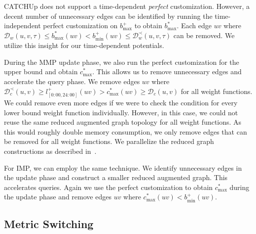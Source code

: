 \documentclass[a4paper,UKenglish,cleveref, autoref, thm-restate]{lipics-v2021}
\newcommand*{\comb}{c}
\newcommand*{\dist}{\mathcal{D}}
\begin{document}
CATCHUp does not support a time-dependent \emph{perfect} customization.
However, a decent number of unnecessary edges can be identified by running the time-independent perfect customization on $b^+_{\max}$ to obtain $b^*_{\max}$.
Each edge $uv$ where $\dist_w(u,v,\tau) \leq b^*_{\max}(uv) < b^+_{\min}(uv) \leq \dist^{\prec}_w(u,v,\tau)$ can be removed.
We utilize this insight for our time-dependent potentials.

During the MMP update phase, we also run the perfect customization for the upper bound and obtain $\comb^*_{\max}$.
This allows us to remove unnecessary edges and accelerate the query phase.
We remove edges $uv$ where $\dist^{\prec}_c(u,v) \geq l_{[0:00, 24:00]}^+(uv) > \comb^*_{\max}(uv) \geq \dist_c(u,v)$ for all weight functions.
We could remove even more edges if we were to check the condition for every lower bound weight function individually.
However, in this case, we could not reuse the same reduced augmented graph topology for all weight functions.
As this would roughly double memory consumption, we only remove edges that can be removed for all weight functions.
We parallelize the reduced graph constructions as described in~\cite{bsw-rttau-19}.

For IMP, we can employ the same technique.
We identify unnecessary edges in the update phase and construct a smaller reduced augmented graph.
This accelerates queries.
Again we use the perfect customization to obtain $\comb^*_{\max}$ during the update phase and remove edges $uv$ where $\comb^*_{\max}(uv) < b^+_{\min}(uv)$.%

\subsection{Metric Switching}
\end{document}
